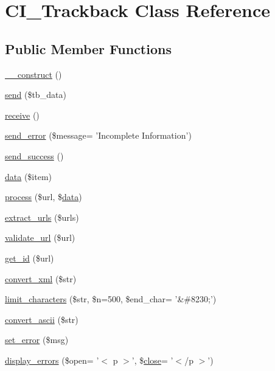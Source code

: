 \hypertarget{class_c_i___trackback}{\section{C\-I\-\_\-\-Trackback Class Reference}
\label{class_c_i___trackback}
}
\subsection*{Public Member Functions}
\begin{DoxyCompactItemize}
\item 
\hyperlink{class_c_i___trackback_a095c5d389db211932136b53f25f39685}{\-\_\-\-\_\-construct} ()
\item 
\hyperlink{class_c_i___trackback_a4ee54341ef16e67ca033704f4373a56b}{send} (\$tb\-\_\-data)
\item 
\hyperlink{class_c_i___trackback_ac805eb3a4eb25b19c1ab093023da4d35}{receive} ()
\item 
\hyperlink{class_c_i___trackback_a277bbe0de9722c8222b90c275f1a2e50}{send\-\_\-error} (\$message= 'Incomplete Information')
\item 
\hyperlink{class_c_i___trackback_a57468453a4dc88340fdf12fb6e314248}{send\-\_\-success} ()
\item 
\hyperlink{class_c_i___trackback_a4d04a7a984a4bcc71e27be87706f393c}{data} (\$item)
\item 
\hyperlink{class_c_i___trackback_a7244ffd64e186d863812bb300fec8cdc}{process} (\$url, \$\hyperlink{class_c_i___trackback_a4d04a7a984a4bcc71e27be87706f393c}{data})
\item 
\hyperlink{class_c_i___trackback_aab29f333201544b83e318dd761ac797a}{extract\-\_\-urls} (\$urls)
\item 
\hyperlink{class_c_i___trackback_a335fce4ef400ec1ec05588c6b79e505e}{validate\-\_\-url} (\$url)
\item 
\hyperlink{class_c_i___trackback_a404e345e61e00d5685117a101b5bc71a}{get\-\_\-id} (\$url)
\item 
\hyperlink{class_c_i___trackback_a1ec67af2037561b65ffe49b59727cb53}{convert\-\_\-xml} (\$str)
\item 
\hyperlink{class_c_i___trackback_ae0ad829d77163bde82745af94068a6b7}{limit\-\_\-characters} (\$str, \$n=500, \$end\-\_\-char= '\&\#8230;')
\item 
\hyperlink{class_c_i___trackback_a0029bda7d34a222a5bda4ac894c31ac1}{convert\-\_\-ascii} (\$str)
\item 
\hyperlink{class_c_i___trackback_a892f1ba7cba3731a3fc68f1f64e92610}{set\-\_\-error} (\$msg)
\item 
\hyperlink{class_c_i___trackback_a3ed4aa1a4d480c82bb1b663efd466aee}{display\-\_\-errors} (\$open= '$<$ p $>$', \$\hyperlink{bootstrap_8min_8js_ac581e13fc2b7b6ddfcf10b44940becde}{close}= '$<$/p $>$')
\end{DoxyCompactItemize}
